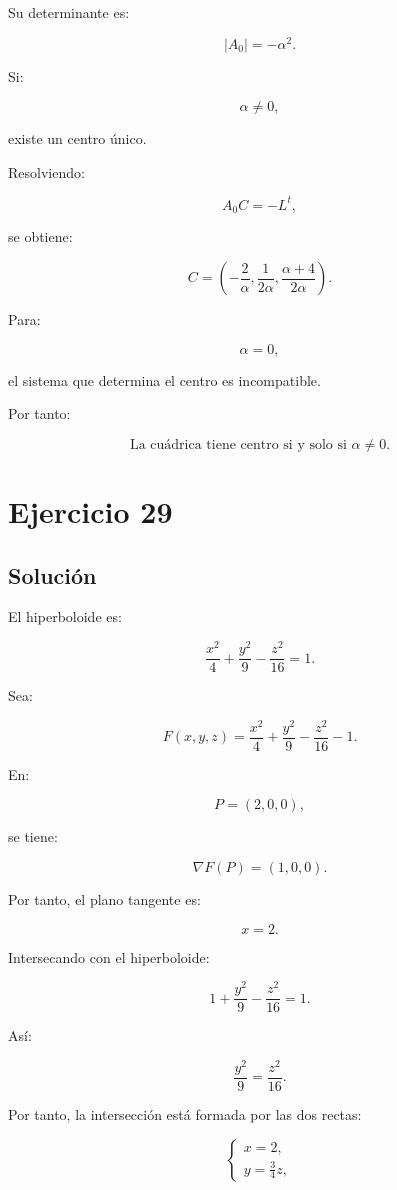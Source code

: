 \documentclass[11pt,a4paper]{article}
\begin{document}
Su determinante es:

\[
|A_0|=-\alpha^2.
\]

Si:

\[
\alpha\neq0,
\]

existe un centro único.

Resolviendo:

\[
A_0C=-L^t,
\]

se obtiene:

\[
\boxed{
C=
\left(
-\frac2\alpha,
\frac1{2\alpha},
\frac{\alpha+4}{2\alpha}
\right).
}
\]

Para:

\[
\alpha=0,
\]

el sistema que determina el centro es incompatible.

Por tanto:

\[
\boxed{
\text{La cuádrica tiene centro si y solo si }\alpha\neq0.
}
\]

\section{Ejercicio 29}
\subsection{Solución}

El hiperboloide es:

\[
\frac{x^2}{4}
+
\frac{y^2}{9}
-
\frac{z^2}{16}
=
1.
\]

Sea:

\[
F(x,y,z)
=
\frac{x^2}{4}
+
\frac{y^2}{9}
-
\frac{z^2}{16}
-
1.
\]

En:

\[
P=(2,0,0),
\]

se tiene:

\[
\nabla F(P)=(1,0,0).
\]

Por tanto, el plano tangente es:

\[
\boxed{
x=2.
}
\]

Intersecando con el hiperboloide:

\[
1+\frac{y^2}{9}-\frac{z^2}{16}=1.
\]

Así:

\[
\frac{y^2}{9}
=
\frac{z^2}{16}.
\]

Por tanto, la intersección está formada por las dos rectas:

\[
\boxed{
\begin{cases}
x=2,\\
y=\frac34z,
\end{cases}
}
\]
\end{document}
